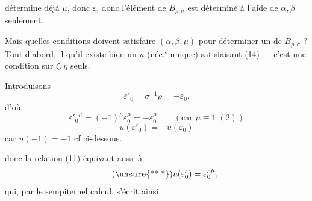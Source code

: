 détermine déjà $\mu$, donc $\varepsilon$, donc \deleted{$(\alpha,\beta)$}  l'élément de $B_{\rho,\sigma}$ est déterminé à l'aide de $\alpha,\beta$ seulement.

Mais quelles conditions doivent satisfaire $(\alpha,\beta,\mu)$ pour déterminer un  de $B_{\rho,\sigma}$ ? Tout d'abord, il  qu'il existe bien un  $u$ (néc.$^{t}$ unique) satisfaisant (14) — c'est une condition sur $\zeta,\eta$ seuls.


Introduisons
\[
\tag{*}
\varepsilon'_0=\sigma^{-1}\rho=-\varepsilon_0.
\]
d'où
\[
{\varepsilon'_0}^{\mu}=(-1)^\mu\varepsilon_0^\mu=-\varepsilon_0^\mu
\qquad(\text{car }\mu\equiv1\;(2))
\]
\[
u(\varepsilon'_0)=-u(\varepsilon_0)
\]
car $u(-1)=-1$ cf ci-dessous.

donc la relation (11) équivaut aussi à
\[
\tag{\unsure{**|*}}
u(\varepsilon'_0)={\varepsilon'_0}^{\mu},
\]
qui, par le sempiternel calcul, s'écrit ainsi

